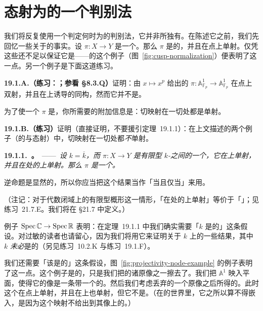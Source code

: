 
\section{态射为\trClosedEmbedding{}的一个判别法}

我们将反复使用一个判定\trMorphism{}何时为\trClosedEmbedding{}的判别法，它并非\trCurve{}所独有。在陈述它之前，我们先回忆一些关于\trClosedEmbedding{}的事实。设 $\pi\colon X\to Y$ 是一个\trClosedEmbedding。那么 $\pi$ 是\trProjective{}的，并且在点上单射。仅凭这些还不足以保证它是\trClosedEmbedding{}——\trCusp{}的\trNormalization{}这个例子（图~\ref{fig:cusp-normalization}）便表明了这一点。另一个例子是下面这道练习。

\textbf{19.1.A.（练习：\trFrobenius；参看 \S8.3.Q）}\quad 证明：由 $x\mapsto x^{p}$ 给出的 $\pi\colon\mathbb{A}^1_{\mathbb{F}_p}\to\mathbb{A}^1_{\mathbb{F}_p}$ 在点上双射，并且在\trClosedPoint{}上诱导\trResidueField{}的同构，然而它并不是\trClosedEmbedding。

为了使一个\trMorphism{} $\pi$ 是\trClosedEmbedding，你所需要的附加信息是：切映射在一切\trClosedPoint{}处都是单射。

\textbf{19.1.B.（练习）}\quad 证明（直接证明，不要援引\mbox{定理~19.1.1}）：在上文描述的两个例子（\trCusp{}的\trNormalization{}与\trFrobenius{}态射）中，切映射在一切\trClosedPoint{}处都\emph{不}单射。

\textbf{19.1.1.\ \trhTheorem。}\ ——\ \emph{设 $k=\overline{k}$，而 $\pi\colon X\to Y$ 是有限型 $k$-\trScheme{}之间的一个\trProjective\trMorphism，它在\trClosedPoint{}上单射，并且在\trClosedPoint{}处的\trTangentVector{}上单射。那么 $\pi$ 是一个\trClosedEmbedding。}

逆命题是显然的，所以你应当把这个结果当作「当且仅当」来用。

（注记：对于代数闭域上的有限型概形这一情形，「在\trClosedPoint{}处的\trTangentVector{}上单射」等价于「\trUnramified」；见\mbox{练习~21.7.E}。我们将在 \S21.7 中定义\trUnramified。）

例子 $\operatorname{Spec}\mathbb{C}\to\operatorname{Spec}\mathbb{R}$ 表明：在\mbox{定理~19.1.1} 中我们确实需要「$k$ 是\trAlgClosed{}的」这条假设。对\trAlgClosedField{}过敏的读者也请留心，因为我们将用它来证明关于 $k$ 上\trCurve{}的一些结果，其中 $k$ \emph{未必}是\trAlgClosed{}的（另见\mbox{练习~10.2.K} 与\mbox{练习~19.1.F}）。

我们还需要「该\trMorphism{}是\trProjective{}的」这条假设，图~\ref{fig:projectivity-node-example} 的例子表明了这一点。这个例子是\trNode{}的\trNormalization{}，只是我们把\trNode{}的诸原像之一擦去了。我们把 $\mathbb{A}^1$ 映入平面，使得它的像是一条带一个\trNode{}的\trCurve。然后我们考虑丢弃\trNode{}的一个原像之后所得的\trMorphism。此时这个\trMorphism{}在点上单射，并且在\trTangentVector{}上也单射，但它不是\trClosedEmbedding{}。（在\trDifferentialGeometry{}的世界里，它之所以算不得嵌入，是因为这个映射不给出到其像上的\trHomeomorphism。）

